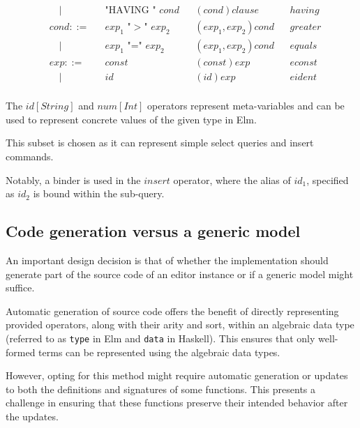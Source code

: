 \documentclass[sigplan,review]{acmart}
\begin{document}
\begin{example}
\[\begin{aligned}
       & \quad |     &  & \text{"HAVING " $cond$}         &   & (cond)clause            &  & having          \\
       & cond ::=    &  & \text{$exp_1$ "$>$" $exp_2$}    &   & (exp_1,exp_2)cond       &  & greater         \\
       & \quad |     &  & \text{$exp_1$ "=" $exp_2$}      &   & (exp_1,exp_2)cond       &  & equals          \\
       & exp ::=     &  & \text{$const$}                  &   & (const)exp              &  & econst          \\
       & \quad |     &  & \text{$id$}                     &   & (id)exp                 &  & eident          \\
    \end{aligned}
  \]


  The $id[String]$ and $num[Int]$ operators represent meta-variables and can be used to represent concrete values of the given type in Elm.

  This subset is chosen as it can represent simple select queries and insert commands.

  Notably, a binder is used in the $insert$ operator, where the alias of $id_1$, specified as $id_2$ is bound within the sub-query.
\end{example}

\subsection{Code generation versus a generic model}

An important design decision is that of whether the implementation
should generate part of the source code of an editor instance or if a
generic model might suffice.

Automatic generation of source code offers the benefit of directly representing
provided operators, along with their arity and sort, within an algebraic data
type (referred to as \texttt{type} in Elm and \texttt{data} in Haskell).
This ensures that only well-formed terms can be represented using the algebraic
data types.

However, opting for this method might require automatic generation or
updates to both the definitions and signatures of some functions.
This presents a challenge in ensuring that these functions preserve
their intended behavior after the updates.
\end{document}
